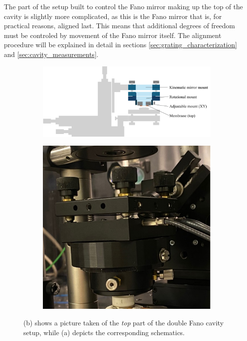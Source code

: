 The part of the setup built to control the Fano mirror making up the top of the cavity is slightly more complicated, as this is the Fano mirror that is, for practical reasons, aligned last. This means that additional degrees of freedom must be controled by movement of the Fano mirror itself. The alignment procedure will be explained in detail in sections \ref{sec:grating_characterization} and \ref{sec:cavity_measurements}.

\begin{figure}[h!]
    \centering
    \begin{subfigure}[b]{0.6\textwidth}
        \includegraphics[width=\textwidth]{figures/setup_top.pdf}
        \caption{}
        \label{fig:setup_top}
    \end{subfigure}
    \begin{subfigure}[b]{0.3\textwidth}
        \includegraphics[width=\textwidth]{figures/cavity_setup_top_pic.pdf}
        \caption{}
        \label{fig:setup_top_pic}
    \end{subfigure}
    \caption{(b) shows a picture taken of the \emph{top} part of the double Fano cavity setup, while (a) depicts the corresponding schematics.}
    \label{fig:setup_top_sketch_and_pic}
\end{figure} 

